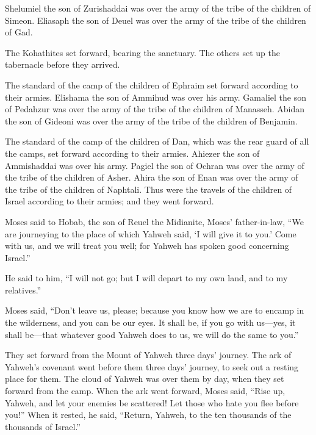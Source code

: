 {Shelumiel the son of Zurishaddai was over the army of the tribe of the children of Simeon.
Eliasaph the son of Deuel was over the army of the tribe of the children of Gad.
\par }{\PP {}The Kohathites set forward, bearing the sanctuary. The others set up the tabernacle before they arrived.
\par }{\PP {}The standard of the camp of the children of Ephraim set forward according to their armies. Elishama the son of Ammihud was over his army.
Gamaliel the son of Pedahzur was over the army of the tribe of the children of Manasseh.
Abidan the son of Gideoni was over the army of the tribe of the children of Benjamin.
\par }{\PP {}The standard of the camp of the children of Dan, which was the rear guard of all the camps, set forward according to their armies. Ahiezer the son of Ammishaddai was over his army.
Pagiel the son of Ochran was over the army of the tribe of the children of Asher.
Ahira the son of Enan was over the army of the tribe of the children of Naphtali.
Thus were the travels of the children of Israel according to their armies; and they went forward.
\par }{\PP {}Moses said to Hobab, the son of Reuel the Midianite, Moses’ father-in-law, “We are journeying to the place of which Yahweh said, ‘I will give it to you.’ Come with us, and we will treat you well; for Yahweh has spoken good concerning Israel.”
\par }{\PP {}He said to him, “I will not go; but I will depart to my own land, and to my relatives.”
\par }{\PP {}Moses said, “Don’t leave us, please; because you know how we are to encamp in the wilderness, and you can be our eyes.
It shall be, if you go with us—yes, it shall be—that whatever good Yahweh does to us, we will do the same to you.”
\par }{\PP {}They set forward from the Mount of Yahweh three days’ journey. The ark of Yahweh’s covenant went before them three days’ journey, to seek out a resting place for them.
The cloud of Yahweh was over them by day, when they set forward from the camp.
When the ark went forward, Moses said, “Rise up, Yahweh, and let your enemies be scattered! Let those who hate you flee before you!”
When it rested, he said, “Return, Yahweh, to the ten thousands of the thousands of Israel.”

}
